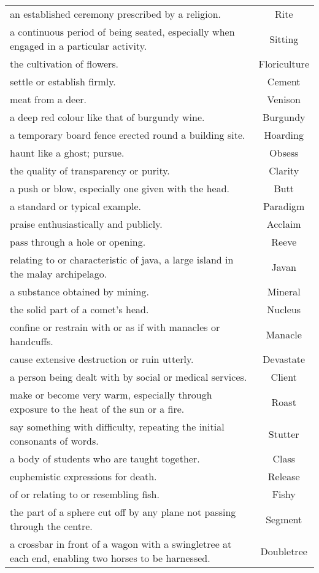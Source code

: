 \begin{longtable}{p{12cm}c}
an established ceremony prescribed by a religion. & Rite\\
a continuous period of being seated, especially when engaged in a particular activity. & Sitting\\
the cultivation of flowers. & Floriculture\\
settle or establish firmly. & Cement\\
meat from a deer. & Venison\\
a deep red colour like that of burgundy wine. & Burgundy\\
a temporary board fence erected round a building site. & Hoarding\\
haunt like a ghost; pursue. & Obsess\\
the quality of transparency or purity. & Clarity\\
a push or blow, especially one given with the head. & Butt\\
a standard or typical example. & Paradigm\\
praise enthusiastically and publicly. & Acclaim\\
pass through a hole or opening. & Reeve\\
relating to or characteristic of java, a large island in the malay archipelago. & Javan\\
a substance obtained by mining. & Mineral\\
the solid part of a comet's head. & Nucleus\\
confine or restrain with or as if with manacles or handcuffs. & Manacle\\
cause extensive destruction or ruin utterly. & Devastate\\
a person being dealt with by social or medical services. & Client\\
make or become very warm, especially through exposure to the heat of the sun or a fire. & Roast\\
say something with difficulty, repeating the initial consonants of words. & Stutter\\
a body of students who are taught together. & Class\\
euphemistic expressions for death. & Release\\
of or relating to or resembling fish. & Fishy\\
the part of a sphere cut off by any plane not passing through the centre. & Segment\\
a crossbar in front of a wagon with a swingletree at each end, enabling two horses to be harnessed. & Doubletree\\

\end{longtable}
